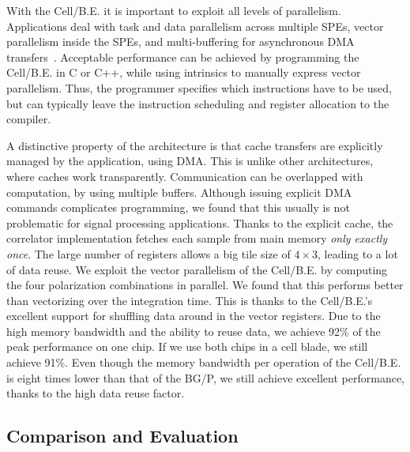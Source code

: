 \documentclass{article}
\begin{document}
\noindent With the
\mbox{Cell/B.E.} it is important to exploit all levels of parallelism.
Applications deal with task and data parallelism across multiple SPEs,
vector parallelism inside the SPEs, and multi-buffering for
asynchronous DMA transfers~\cite{cell}.  Acceptable performance can be achieved by
programming the \mbox{Cell/B.E.}  in C or C++, while using intrinsics
to manually express vector parallelism.  Thus, the programmer
specifies which instructions have to be used, but can typically leave
the instruction scheduling and register allocation to the compiler.

A distinctive property of the architecture is that cache transfers are
explicitly managed by the application, using DMA. This is unlike other 
architectures, where caches work transparently.
Communication can be overlapped with computation, by using multiple buffers.
Although issuing explicit DMA commands complicates programming,
we found that this usually is not problematic for signal processing applications.
Thanks to the explicit cache,
the correlator implementation fetches each sample from main memory
\emph{only exactly once}. 
The large number of registers allows a big tile size of 
$4\times3$, leading to a lot of data reuse.
We exploit the vector parallelism of the \mbox{Cell/B.E.} by computing the four
polarization combinations in parallel.  We found that this performs
better than vectorizing over the integration time.  This is thanks to the \mbox{Cell/B.E.}'s
excellent support for shuffling data around in the vector registers.
Due to the high
memory bandwidth and the ability to reuse data, we achieve 92\% of the peak
performance on one chip.  If we use both chips in a cell blade, we still achieve
91\%.  Even though the memory
bandwidth per operation of the \mbox{Cell/B.E.} is eight times lower than
that of the BG/P, we still achieve excellent performance, thanks to
the high data reuse factor.


\subsection{Comparison and Evaluation}
\label{sec:perf-compare}
\end{document}
